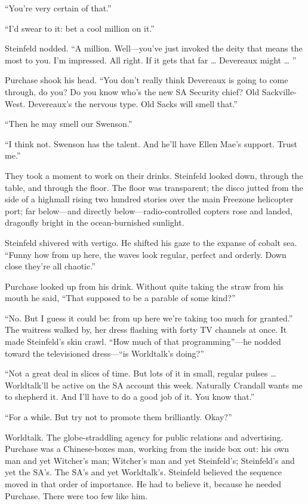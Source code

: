 “You’re very certain of that.”

“I’d swear to it: bet a cool million on it.”

Steinfeld nodded. “A million. Well—you’ve just invoked the deity that means the most to you. I’m impressed. All right. If it gets that far … Devereaux might … ”

Purchase shook his head. “You don’t really think Devereaux is going to come through, do you? Do you know who’s the new SA Security chief? Old Sackville-West. Devereaux’s the nervous type. Old Sacks will smell that.”

“Then he may smell our Swenson.”

“I think not. Swenson has the talent. And he’ll have Ellen Mae’s support. Trust me.”

They took a moment to work on their drinks. Steinfeld looked down, through the table, and through the floor. The floor was transparent; the disco jutted from the side of a highmall rising two hundred stories over the main Freezone helicopter port; far below—and directly below—radio-controlled copters rose and landed, dragonfly bright in the ocean-burnished sunlight.

Steinfeld shivered with vertigo. He shifted his gaze to the expanse of cobalt sea. “Funny how from up here, the waves look regular, perfect and orderly. Down close they’re all chaotic.”

Purchase looked up from his drink. Without quite taking the straw from his mouth he said, “That supposed to be a parable of some kind?”

“No. But I guess it could be: from up here we’re taking too much for granted.” The waitress walked by, her dress flashing with forty TV channels at once. It made Steinfeld’s skin crawl. “How much of that programming”—he nodded toward the televisioned dress—“is Worldtalk’s doing?”

“Not a great deal in slices of time. But lots of it in small, regular pulses … Worldtalk’ll be active on the SA account this week. Naturally Crandall wants me to shepherd it. And I’ll have to do a good job of it. You know that.”

“For a while. But try not to promote them brilliantly. Okay?”

Worldtalk. The globe-straddling agency for public relations and advertising. Purchase was a Chinese-boxes man, working from the inside box out: his own man and yet Witcher’s man; Witcher’s man and yet Steinfeld’s; Steinfeld’s and yet the SA’s. The SA’s and yet Worldtalk’s. Steinfeld believed the sequence moved in that order of importance. He had to believe it, because he needed Purchase. There were too few like him.

